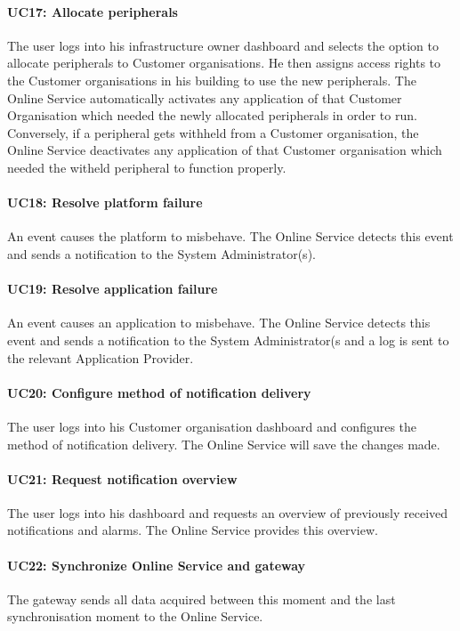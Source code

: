 \documentclass[english]{sareport}
\begin{document}
\paragraph{UC17: Allocate peripherals}
The user logs into his infrastructure owner dashboard and selects the option to allocate peripherals to Customer organisations. He then assigns access rights to the Customer organisations in his building to use the new peripherals. The Online Service automatically activates any application of that Customer Organisation which needed the newly allocated peripherals in order to run. Conversely, if a peripheral gets withheld from a Customer organisation, the Online Service deactivates any application of that Customer organisation which needed the witheld peripheral to function properly.

\paragraph{UC18: Resolve platform failure}
An event causes the platform to misbehave. The Online Service detects this event and sends a notification to the System Administrator(s).

\paragraph{UC19: Resolve application failure}
An event causes an application to misbehave. The Online Service detects this event and sends a notification to the System Administrator(s and a log is sent to the relevant Application Provider.

\paragraph{UC20: Configure method of notification delivery}
The user logs into his Customer organisation dashboard and configures the method of notification delivery. The Online Service will save the changes made.

\paragraph{UC21: Request notification overview}
The user logs into his dashboard and requests an overview of previously received notifications and alarms. The Online Service provides this overview.

\paragraph{UC22: Synchronize Online Service and gateway}
The gateway sends all data acquired between this moment and the last synchronisation moment to the Online Service.
\end{document}

